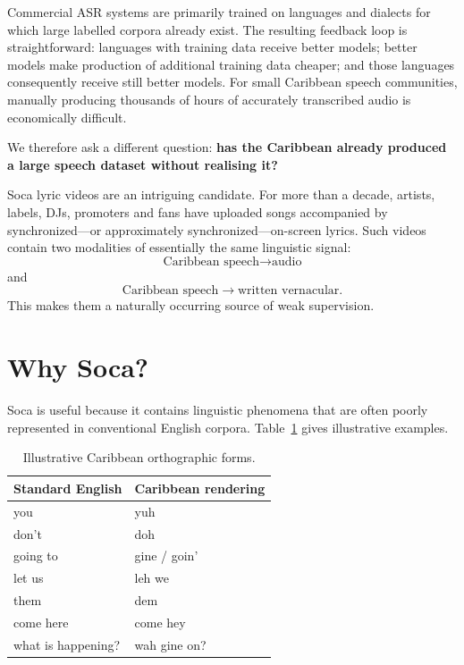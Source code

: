 \documentclass[10pt,twocolumn]{article}
\begin{document}
Commercial ASR systems are primarily trained on languages and dialects for which large labelled corpora already exist. The resulting feedback loop is straightforward: languages with training data receive better models; better models make production of additional training data cheaper; and those languages consequently receive still better models. For small Caribbean speech communities, manually producing thousands of hours of accurately transcribed audio is economically difficult.

We therefore ask a different question: \textbf{has the Caribbean already produced a large speech dataset without realising it?}

Soca lyric videos are an intriguing candidate. For more than a decade, artists, labels, DJs, promoters and fans have uploaded songs accompanied by synchronized---or approximately synchronized---on-screen lyrics. Such videos contain two modalities of essentially the same linguistic signal:
\begin{equation}
\text{Caribbean speech} \rightarrow \text{audio}
\end{equation}
and
\begin{equation}
\text{Caribbean speech} \rightarrow \text{written vernacular}.
\end{equation}
This makes them a naturally occurring source of weak supervision.

\section{Why Soca?}
Soca is useful because it contains linguistic phenomena that are often poorly represented in conventional English corpora. Table~\ref{tab:forms} gives illustrative examples.

\begin{table}[h]
\centering
\caption{Illustrative Caribbean orthographic forms.}
\label{tab:forms}
\small
\begin{tabular}{p{}p{}}
\toprule
\textbf{Standard English} & \textbf{Caribbean rendering}\\
\midrule
you & yuh\\
don't & doh\\
going to & gine / goin'\\
let us & leh we\\
them & dem\\
come here & come hey\\
what is happening? & wah gine on?\\
\bottomrule
\end{tabular}
\end{table}
\end{document}
